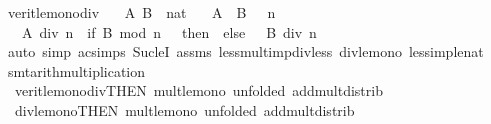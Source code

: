 \begin{isabellebody}
\isamarkupfalse%
%
\endisatagproof
{\isafoldproof}%
%
\isadelimproof
\isanewline
%
\endisadelimproof
\isanewline
{}\isamarkupfalse%
\ verit{\isacharunderscore}{\kern0pt}le{\isacharunderscore}{\kern0pt}mono{\isacharunderscore}{\kern0pt}div{\isacharcolon}{\kern0pt}\isanewline
\ \ \ A\ B\ {\isacharcolon}{\kern0pt}{\isacharcolon}{\kern0pt}\ nat\isanewline
\ \ \ {\isachardoublequoteopen}A\ {\isacharless}{\kern0pt}\ B{\isachardoublequoteclose}\ {\isachardoublequoteopen}{}\ {\isacharless}{\kern0pt}\ n{\isachardoublequoteclose}\isanewline
\ \ \ {\isachardoublequoteopen}{\isacharparenleft}{\kern0pt}A\ div\ n{\isacharparenright}{\kern0pt}\ {\isacharplus}{\kern0pt}\ {\isacharparenleft}{\kern0pt}if\ B\ mod\ n\ {\isacharequal}{\kern0pt}\ {}\ then\ {}\ else\ {}{\isacharparenright}{\kern0pt}\ {\isasymle}\ {\isacharparenleft}{\kern0pt}B\ div\ n{\isacharparenright}{\kern0pt}{\isachardoublequoteclose}\isanewline
%
\isadelimproof
\ \ %
\endisadelimproof
%
\isatagproof
{}\isamarkupfalse%
\ {\isacharparenleft}{\kern0pt}auto\ simp{\isacharcolon}{\kern0pt}\ ac{\isacharunderscore}{\kern0pt}simps\ Suc{\isacharunderscore}{\kern0pt}leI\ assms\ less{\isacharunderscore}{\kern0pt}mult{\isacharunderscore}{\kern0pt}imp{\isacharunderscore}{\kern0pt}div{\isacharunderscore}{\kern0pt}less\ div{\isacharunderscore}{\kern0pt}le{\isacharunderscore}{\kern0pt}mono\ less{\isacharunderscore}{\kern0pt}imp{\isacharunderscore}{\kern0pt}le{\isacharunderscore}{\kern0pt}nat{\isacharparenright}{\kern0pt}%
\endisatagproof
{\isafoldproof}%
%
\isadelimproof
\isanewline
%
\endisadelimproof
\isanewline
{}\isamarkupfalse%
\ {\isacharbrackleft}{\kern0pt}smt{\isacharunderscore}{\kern0pt}arith{\isacharunderscore}{\kern0pt}multiplication{\isacharbrackright}{\kern0pt}\ {\isacharequal}{\kern0pt}\isanewline
\ \ verit{\isacharunderscore}{\kern0pt}le{\isacharunderscore}{\kern0pt}mono{\isacharunderscore}{\kern0pt}div{\isacharbrackleft}{\kern0pt}THEN\ mult{\isacharunderscore}{\kern0pt}le{\isacharunderscore}{\kern0pt}mono{}{\isacharcomma}{\kern0pt}\ unfolded\ add{\isacharunderscore}{\kern0pt}mult{\isacharunderscore}{\kern0pt}distrib{\isacharbrackright}{\kern0pt}\isanewline
\ \ div{\isacharunderscore}{\kern0pt}le{\isacharunderscore}{\kern0pt}mono{\isacharbrackleft}{\kern0pt}THEN\ mult{\isacharunderscore}{\kern0pt}le{\isacharunderscore}{\kern0pt}mono{}{\isacharcomma}{\kern0pt}\ unfolded\ add{\isacharunderscore}{\kern0pt}mult{\isacharunderscore}{\kern0pt}distrib{\isacharbrackright}{\kern0pt}\isanewline

\end{isabellebody}
